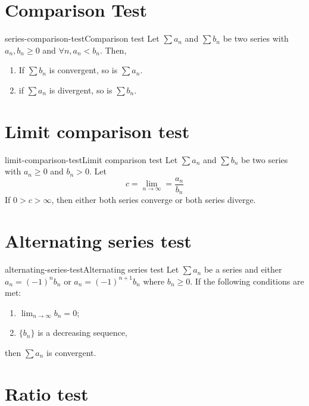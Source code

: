\documentclass[preview]{standalone}
\begin{document}
\genpage

\section{Comparison Test}

\begin{snippettheorem}{series-comparison-test}{Comparison test}
    Let \(\sum a_n\) and \(\sum b_n\) be two series with \(a_n, b_n \geq 0\)
    and \(\forall n, a_n < b_n\). Then,
    \begin{enumerate}
        \item If \(\sum b_n\) is convergent, so is \(\sum a_n\).
        \item if \(\sum a_n\) is divergent, so is \(\sum b_n\).
    \end{enumerate}
\end{snippettheorem}

\section{Limit comparison test}

\begin{snippettheorem}{limit-comparison-test}{Limit comparison test}
    Let \(\sum a_n\) and \(\sum b_n\) be two series with \(a_n \geq 0\)
    and \(b_n > 0\). Let
    \[ c = \lim_{n \to \infty} = \frac{a_n}{b_n} \]
    If \(0 > c > \infty\), then either both series converge or both series diverge.
\end{snippettheorem}

\section{Alternating series test}

\begin{snippettheorem}{alternating-series-test}{Alternating series test}
    Let \(\sum a_n\) be a series
    and either \(a_n = {(-1)}^n b_n\) or \(a_n = {(-1)}^{n+1} b_n\)
    where \(b_n \geq 0\).
    If the following conditions are met:
    \begin{enumerate}
        \item \(\lim_{n \to \infty} b_n = 0\);
        \item \(\{b_n\}\) is a decreasing sequence,
    \end{enumerate}
    then \(\sum a_n\) is convergent.
\end{snippettheorem}

\section{Ratio test}
\end{document}
